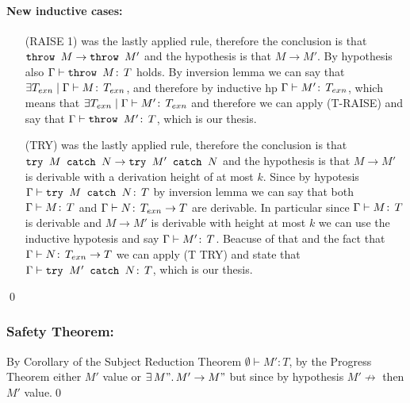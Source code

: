 \paragraph*{New inductive cases:\\}
\begin{itemize}
\item[(RAISE 1)] was the lastly applied rule, therefore the conclusion
  is that \(\texttt{throw }M \to \texttt{throw }M'\) and the hypothesis is that
  \(M\to M'\). By hypothesis also \(\Gamma\vdash \texttt{throw }M \!:\,T\)
  holds. By inversion lemma we can say that \(\exists T_{exn} \mid
  \Gamma \vdash M \!:\,T_{exn}\), and therefore by inductive hp
  \(\Gamma \vdash M' \!:\,T_{exn}\), which means that \(\exists
  T_{exn} \mid \Gamma \vdash M' \!:\,T_{exn}\) and therefore we can
  apply (T-RAISE) and say that \(\Gamma \vdash \texttt{throw }M' \!:\,T\),
  which is our thesis.
\item[(TRY)] was the lastly applied rule, therefore the conclusion is
  that \(\texttt{try }M\texttt{ catch }N \to \texttt{try }M'\texttt{ catch }N\) and the hypothesis is that \(M
  \to M'\) is derivable with a derivation height of at most
  \(k\). Since by hypotesis \(\Gamma \vdash \texttt{try }M\texttt{ catch }N\!:\,T\) by
  inversion lemma we can say that both \(\Gamma\vdash M \!:\,T\) and
  \(\Gamma\vdash N \!:\,T_{exn} \to T\) are derivable. In particular
  since \(\Gamma\vdash M \!:\,T\) is derivable and \(M \to M'\) is
  derivable with height at most \(k\) we can use the inductive
  hypotesis and say \(\Gamma\vdash M' \!:\,T\). Beacuse of that and
  the fact that \(\Gamma\vdash N \!:\,T_{exn} \to T\) we can apply
  (T TRY) and state that \(\Gamma\vdash \texttt{try }M'\texttt{ catch }N \!:\,T\), which
  is our thesis.
\end{itemize} \qed

\subsubsection*{Safety Theorem:}

By Corollary of the Subject Reduction Theorem \(\emptyset \vdash M':
T\), by the Progress Theorem either \(M'\) value or \(\exists\, M".\,
M' \to M"\) but since by hypothesis \(M' \not\to\) then \(M'\)
value.\qed
